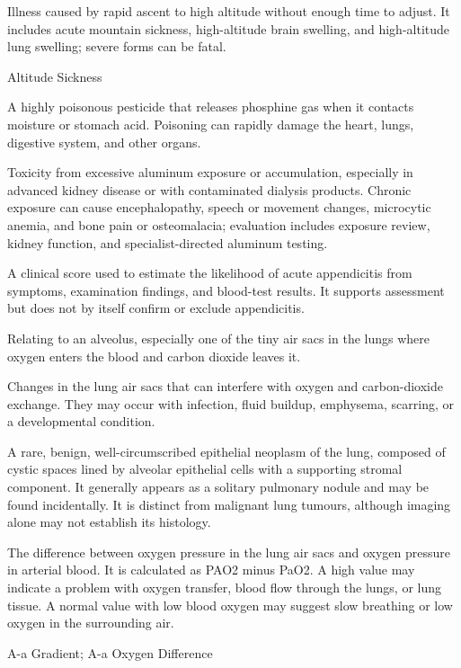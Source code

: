  Illness caused by rapid ascent to high altitude without enough time to adjust. It includes acute mountain sickness, high-altitude brain swelling, and high-altitude lung swelling; severe forms can be fatal.

\synonyms
Altitude Sickness

 A highly poisonous pesticide that releases phosphine gas when it contacts moisture or stomach acid. Poisoning can rapidly damage the heart, lungs, digestive system, and other organs.

 Toxicity from excessive aluminum exposure or accumulation, especially in advanced kidney disease or with contaminated dialysis products. Chronic exposure can cause encephalopathy, speech or movement changes, microcytic anemia, and bone pain or osteomalacia; evaluation includes exposure review, kidney function, and specialist-directed aluminum testing.

 A clinical score used to estimate the likelihood of acute appendicitis from symptoms, examination findings, and blood-test results. It supports assessment but does not by itself confirm or exclude appendicitis.

 Relating to an alveolus, especially one of the tiny air sacs in the lungs where oxygen enters the blood and carbon dioxide leaves it.

 Changes in the lung air sacs that can interfere with oxygen and carbon-dioxide exchange. They may occur with infection, fluid buildup, emphysema, scarring, or a developmental condition.

 A rare, benign, well-circumscribed epithelial neoplasm of the lung,
composed of cystic spaces lined by alveolar epithelial cells with a supporting stromal component.
It generally appears as a solitary pulmonary nodule and may be found incidentally. It is distinct
from malignant lung tumours, although imaging alone may not establish its histology.

 The difference between oxygen pressure in the lung air sacs and oxygen pressure in arterial blood. It is calculated as PAO2 minus PaO2. A high value may indicate a problem with oxygen transfer, blood flow through the lungs, or lung tissue. A normal value with low blood oxygen may suggest slow breathing or low oxygen in the surrounding air.

\synonyms
A-a Gradient; A-a Oxygen Difference

